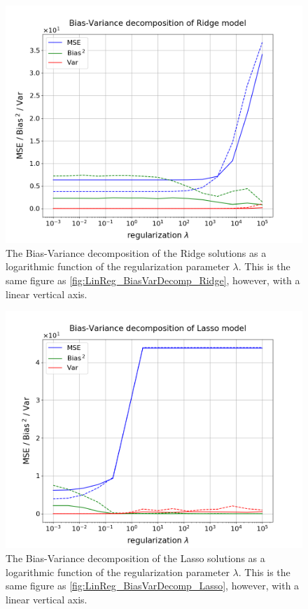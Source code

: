 \documentclass[nofootinbib,reprint,english]{revtex4-1}
\begin{document}
\newpage

\begin{figure}[ht]
\centering
\includegraphics[scale=0.3]{../output/LinReg/BiasVarDecomp_Ridge_linlog.png}
\caption{The Bias-Variance decomposition of the Ridge solutions as a logarithmic function of the regularization parameter \(\lambda\). This is the same figure as \ref{fig:LinReg_BiasVarDecomp_Ridge}, however, with a linear vertical axis.}\label{fig:LinReg_BiasVarDecomp_Ridge_lin}
\end{figure}

\begin{figure}[ht]
\centering
\includegraphics[scale=0.3]{../output/LinReg/BiasVarDecomp_Lasso_linlog.png}
\caption{The Bias-Variance decomposition of the Lasso solutions as a logarithmic function of the regularization parameter \(\lambda\). This is the same figure as \ref{fig:LinReg_BiasVarDecomp_Lasso}, however, with a linear vertical axis.}\label{fig:LinReg_BiasVarDecomp_Lasso_lin}
\end{figure}
\end{document}
